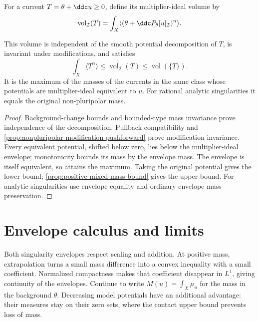 \begin{definition}\label{def:multiplier-envelope-volume}
For a current $T=\theta+\ddc u\geq0$, define its multiplier-ideal volume by
\[
 \operatorname{vol}_{\mathcal I}(T)
      =\int_X\langle(\theta+\ddc P_\theta[u]_{\mathcal I})^n\rangle.
\]
\end{definition}

\begin{corollary}\label{cor:multiplier-envelope-volume-bounds}
This volume is independent of the smooth potential decomposition of $T$, is invariant under modifications, and satisfies
\[
 \int_X\langle T^n\rangle
       \leq\operatorname{vol}_{\mathcal I}(T)
       \leq\operatorname{vol}(\{T\}).
\]
It is the maximum of the masses of the currents in the same class whose potentials are multiplier-ideal equivalent to $u$. For rational analytic singularities it equals the original non-pluripolar mass.
\end{corollary}
\begin{proof}
Background-change bounds and bounded-type mass invariance prove independence of the decomposition. Pullback compatibility and \cref{prop:nonpluripolar-modification-pushforward} prove modification invariance. Every equivalent potential, shifted below zero, lies below the multiplier-ideal envelope; monotonicity bounds its mass by the envelope mass. The envelope is itself equivalent, so attains the maximum. Taking the original potential gives the lower bound; \cref{prop:positive-mixed-mass-bound} gives the upper bound. For analytic singularities use envelope equality and ordinary envelope mass preservation.
\end{proof}

\section{Envelope calculus and limits}
\label{sec:envelope-calculus-limits}
Both singularity envelopes respect scaling and addition. At positive mass, extrapolation turns a small mass difference into a convex inequality with a small coefficient. Normalized compactness makes that coefficient disappear in $L^1$, giving continuity of the envelopes. Continue to write $M(u)=\int_X\mu_u$ for the mass in the background $\theta$. Decreasing model potentials have an additional advantage: their measures stay on their zero sets, where the contact upper bound prevents loss of mass.

